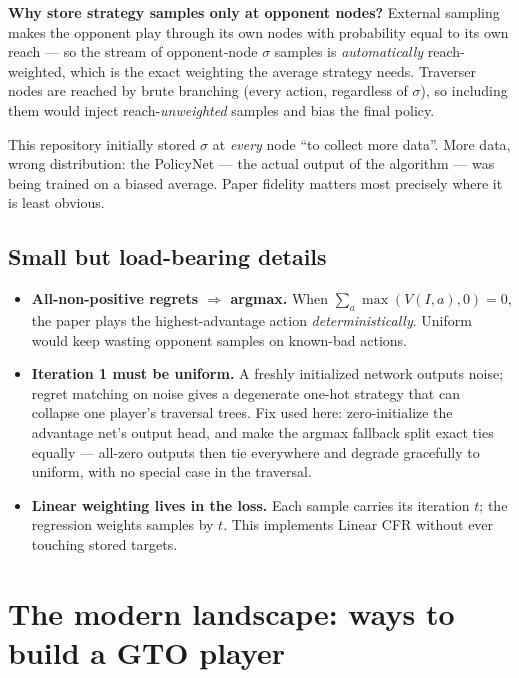 \documentclass[11pt,a4paper]{article}
\begin{document}
\begin{intuition}
\textbf{Why store strategy samples only at opponent nodes?}
External sampling makes the opponent play through its own nodes with
probability equal to its own reach --- so the stream of opponent-node
$\sigma$ samples is \emph{automatically} reach-weighted, which is the exact
weighting the average strategy needs. Traverser nodes are reached by brute
branching (every action, regardless of $\sigma$), so including them would
inject reach-\emph{unweighted} samples and bias the final policy.
\end{intuition}

\begin{trap}
This repository initially stored $\sigma$ at \emph{every} node ``to collect
more data''. More data, wrong distribution: the PolicyNet --- the actual output
of the algorithm --- was being trained on a biased average. Paper fidelity
matters most precisely where it is least obvious.
\end{trap}

\subsection{Small but load-bearing details}

\begin{itemize}[leftmargin=1.4em, itemsep=2pt]
\item \textbf{All-non-positive regrets $\Rightarrow$ argmax.} When
  $\sum_a \max(V(I,a),0)=0$, the paper plays the highest-advantage action
  \emph{deterministically}. Uniform would keep wasting opponent samples on
  known-bad actions.
\item \textbf{Iteration 1 must be uniform.} A freshly initialized network
  outputs noise; regret matching on noise gives a degenerate one-hot strategy
  that can collapse one player's traversal trees. Fix used here: zero-initialize
  the advantage net's output head, and make the argmax fallback split exact
  ties equally --- all-zero outputs then tie everywhere and degrade gracefully
  to uniform, with no special case in the traversal.
\item \textbf{Linear weighting lives in the loss.} Each sample carries its
  iteration $t$; the regression weights samples by $t$. This implements Linear
  CFR without ever touching stored targets.
\end{itemize}

\section{The modern landscape: ways to build a GTO player}
\end{document}
